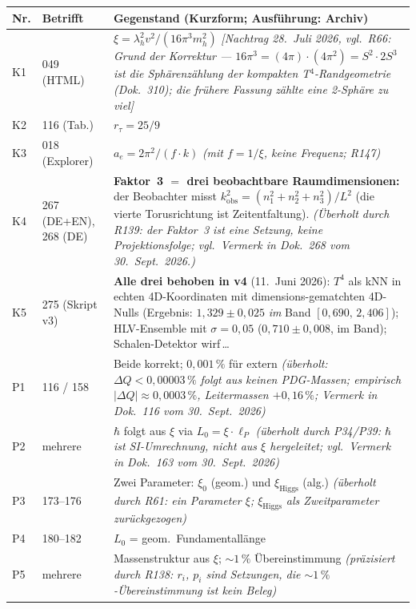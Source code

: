 \begingroup\small
\begin{longtable}{@{}p{0.9cm}p{3.1cm}p{10.2cm}@{}}
\toprule
\textbf{Nr.} & \textbf{Betrifft} & \textbf{Gegenstand (Kurzform; Ausf\"uhrung: Archiv)} \\
\midrule\endhead
\bottomrule\endfoot
K1 & 049 (HTML) & $\xi = \lambda_h^2 v^2/(16\pi^3 m_h^2)$ \emph{[Nachtrag 28.~Juli 2026, vgl.\ R66: Grund der Korrektur --- $16\pi^3 = (4\pi)\cdot(4\pi^2) = S^2\cdot 2S^3$ ist die Sphärenzählung der kompakten T$^4$-Randgeometrie (Dok.~310); die frühere Fassung zählte eine 2-Sphäre zu viel]} \\
K2 & 116 (Tab.) & $r_\tau = 25/9$ \\
K3 & 018 (Explorer) & $a_e = 2\pi^2/(f \cdot k)$ \emph{(mit $f = 1/\xi$, keine Frequenz; R147)} \\
K4 & 267 (DE+EN), 268 (DE) & \textbf{Faktor~3 $=$ drei beobachtbare Raumdimensionen:} der Beobachter misst $k_\mathrm{obs}^2=(n_1^2+n_2^2+n_3^2)/L^2$ (die vierte Torusrichtung ist Zeitentfaltung). \emph{(Überholt durch R139: der Faktor~3 ist eine Setzung, keine Projektionsfolge; vgl.\ Vermerk in Dok.~268 vom 30.~Sept.~2026.)} \\
K5 & 275 (Skript v3) & \textbf{Alle drei behoben in v4} (11.~Juni 2026): $T^4$ als kNN in echten 4D-Koordinaten mit dimensions-gematchten 4D-Nulls (Ergebnis: $1{,}329\pm0{,}025$ \emph{im} Band $[0{,}690,\,2{,}406]$); HLV-Ensemble mit $\sigma=0{,}05$ ($0{,}710\pm0{,}008$, im Band); Schalen-Detektor wirf\,\ldots \\
P1 & 116 / 158 & Beide korrekt; $0{,}001\,\%$ für extern \emph{(überholt: $\Delta Q<0{,}00003\,\%$ folgt aus keinen PDG-Massen; empirisch $|\Delta Q|\approx0{,}0003\,\%$, Leitermassen $+0{,}16\,\%$; Vermerk in Dok.~116 vom 30.~Sept.~2026)} \\
P2 & mehrere & $\hbar$ folgt aus $\xi$ via $L_0 = \xi\cdot\ell_P$ \emph{(überholt durch P34/P39: $\hbar$ ist SI-Umrechnung, nicht aus $\xi$ hergeleitet; vgl.\ Vermerk in Dok.~163 vom 30.~Sept.~2026)} \\
P3 & 173--176 & Zwei Parameter: $\xi_0$ (geom.) und $\xi_{\text{Higgs}}$ (alg.) \emph{(überholt durch R61: ein Parameter $\xi$; $\xi_{\text{Higgs}}$ als Zweitparameter zurückgezogen)} \\
P4 & 180--182 & $L_0$ = geom.\ Fundamentallänge \\
P5 & mehrere & Massenstruktur aus $\xi$; $\sim 1\,\%$ Übereinstimmung \emph{(präzisiert durch R138: $r_i$, $p_i$ sind Setzungen, die $\sim1\,\%$-Übereinstimmung ist kein Beleg)} \\

\end{longtable}
